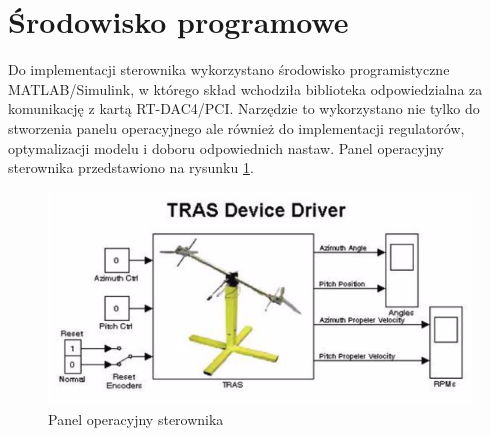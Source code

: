 \section{Środowisko programowe}

Do implementacji sterownika wykorzystano środowisko programistyczne MATLAB/Simulink, w którego skład wchodziła biblioteka odpowiedzialna za komunikację z kartą RT-DAC4/PCI. Narzędzie to wykorzystano nie tylko do stworzenia panelu operacyjnego ale również do implementacji regulatorów, optymalizacji modelu i doboru odpowiednich nastaw. Panel operacyjny sterownika przedstawiono na rysunku \ref{heli_panel}.  

\begin{figure}[h!]
	\centering
	\includegraphics[scale = 1]{fig/heli_panel.png}
	\caption		
	{Panel operacyjny sterownika}
	\label{heli_panel}
\end{figure}